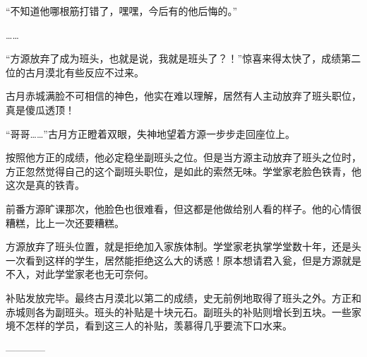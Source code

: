 \begin{this_body}
“不知道他哪根筋打错了，嘿嘿，今后有的他后悔的。”

……

“方源放弃了成为班头，也就是说，我就是班头了？！”惊喜来得太快了，成绩第二位的古月漠北有些反应不过来。

古月赤城满脸不可相信的神色，他实在难以理解，居然有人主动放弃了班头职位，真是傻瓜透顶！

“哥哥……”古月方正瞪着双眼，失神地望着方源一步步走回座位上。

按照他方正的成绩，他必定稳坐副班头之位。但是当方源主动放弃了班头之位时，方正忽然觉得自己的这个副班头职位，是如此的索然无味。学堂家老脸色铁青，他这次是真的铁青。

前番方源旷课那次，他脸色也很难看，但这都是他做给别人看的样子。他的心情很糟糕，比上一次还要糟糕。

方源放弃了班头位置，就是拒绝加入家族体制。学堂家老执掌学堂数十年，还是头一次看到这样的学生，居然能拒绝这么大的诱惑！原本想请君入瓮，但是方源就是不入，对此学堂家老也无可奈何。

补贴发放完毕。最终古月漠北以第二的成绩，史无前例地取得了班头之外。方正和赤城则各为副班头。班头的补贴是十块元石。副班头的补贴则增长到五块。一些家境不怎样的学员，看到这三人的补贴，羡慕得几乎要流下口水来。

------------

\end{this_body}

